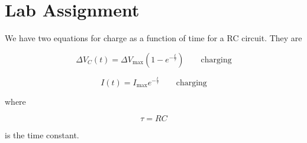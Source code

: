 \vspace*{\fill}
\pagebreak

\section{Lab Assignment}

We have two equations for charge as a function of time for a RC circuit.
They are

\begin{equation*}
	\Delta V_{C}\left( t\right) =\Delta V_{\max }\left( 1-e^{-\frac{t}{\tau }}\right) \qquad \text{charging}
\end{equation*}

\begin{equation*}
	I\left( t\right) =I_{\max }e^{-\frac{t}{\tau }}\qquad \text{charging}
\end{equation*}

where 

\begin{equation}
	\tau =RC
\end{equation}

is the time constant.

